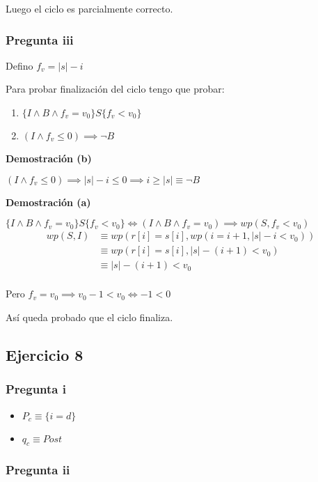 Luego el ciclo es parcialmente correcto.

\subsubsection{Pregunta iii}

Defino $ f_v = |s| - i $

Para probar finalización del ciclo tengo que probar:
\begin{enumerate}[label=(\alph*)]
    \item $ \{ I \wedge B \wedge f_v = v_0 \} S \{ f_v < v_0 \} $
    \item $ (I \wedge f_v \leq 0) \implies \neg B $
\end{enumerate}

\textbf{Demostración (b)}

$ (I \wedge f_v \leq 0) \implies |s| - i \leq 0 \implies i \geq |s| \equiv \neg B $

\textbf{Demostración (a)}

$ \{ I \wedge B \wedge f_v = v_0 \} S \{ f_v < v_0 \} \iff (I \wedge B \wedge f_v = v_0) \implies wp(S, f_v < v_0) $
\begin{align*}
    wp(S,I) &\equiv wp(r[i] = s[i], wp(i=i+1, |s| - i < v_0)) \\
    &\equiv wp(r[i] = s[i], |s| - (i+1) < v_0) \\
    &\equiv |s| - (i+1) < v_0 \\
\end{align*}

Pero $ f_v = v_0 \implies v_0 - 1 < v_0 \iff -1 < 0 $

Así queda probado que el ciclo finaliza.

\subsection{Ejercicio 8}

\subsubsection{Pregunta i}

\begin{itemize}
    \item $ P_c \equiv \{ i = d \} $
    \item $ q_c \equiv Post $
\end{itemize}

\subsubsection{Pregunta ii}

